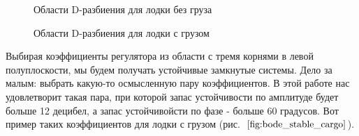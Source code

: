 \documentclass[12pt,a4paper]{article}
\begin{document}

\begin{figure}
	\caption{Области D-разбиения для лодки без груза}
\end{figure}

\begin{figure}
	\caption{Области D-разбиения для лодки с грузом}
\end{figure}

Выбирая коэффициенты регулятора из области с тремя корнями в левой полуплоскости, мы будем получать устойчивые замкнутые системы. Дело за малым: выбрать какую-то осмысленную пару коэффициентов. В этой работе нас удовлетворит такая пара, при которой запас устойчивости по амплитуде будет больше 12 децибел, а запас устойчивойсти по фазе - больше 60 градусов. Вот пример таких коэффициентов для лодки с грузом (рис.~$\ref{fig:bode_stable_cargo}$). 
\end{document}
